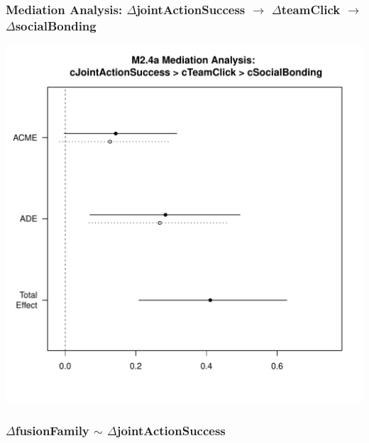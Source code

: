 \documentclass[12pt]{report}
\begin{document}
\newpage
\subsubsection{Mediation Analysis: $\Delta$jointActionSuccess $\rightarrow$ $\Delta$teamClick $\rightarrow$ $\Delta$socialBonding}

\newpage
\centering
\includegraphics[width=\columnwidth]{../images/MLM24aMediationAnalysis.pdf}

\newpage
\centering
\subsubsection{$\Delta$fusionFamily $\sim$ $\Delta$jointActionSuccess}

\newpage
\centering

\end{document}
